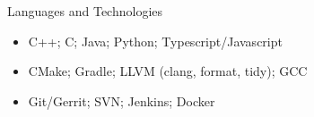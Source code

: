 \documentclass[]{mcdowellcv}
\begin{document}
	\begin{cvsection}{Languages and Technologies}
		\begin{cvsubsection}{}{}{}
			\begin{itemize}
				\item C++; C; Java; Python; Typescript/Javascript
				\item CMake; Gradle; LLVM  (clang, format, tidy); GCC
				\item Git/Gerrit; SVN; Jenkins; Docker
			\end{itemize}
		\end{cvsubsection}
	\end{cvsection}
\end{document}
